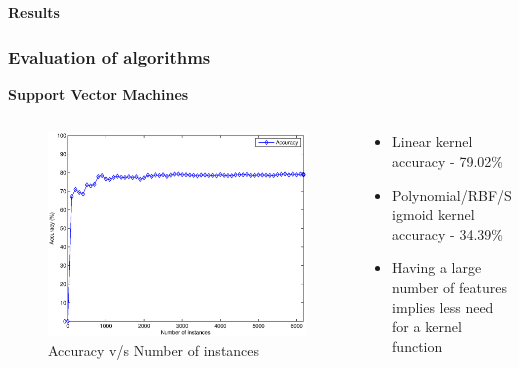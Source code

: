 \documentclass{beamer}
\begin{document}
    \begin{frame}
        \begin{center}
            \textbf{Results}
        \end{center}
    \end{frame}
    
    \begin{frame}
        \frametitle{Evaluation of algorithms}
        \begin{center}
            \textbf{Support Vector Machines}
        \end{center}
        \begin{columns}
            \begin{column}{0.5\textwidth}
                \begin{figure}
                    \centering
                    \includegraphics[width=\textwidth]{figures/svm_accuracy.eps}
                    \caption{Accuracy v/s Number of instances}
                \end{figure}
            \end{column}
            \begin{column}{0.5\textwidth}
                \begin{itemize}
                    \item{Linear kernel accuracy - 79.02\%}
                    \item{Polynomial/RBF/Sigmoid kernel accuracy - 34.39\%}
                    \item{Having a large number of features implies less need for a kernel function}
                \end{itemize}
            \end{column}
        \end{columns}
    \end{frame}
    
\end{document}
